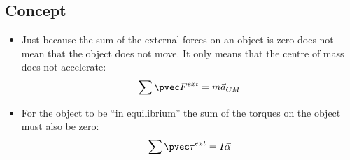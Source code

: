\documentclass[aspectratio=169,
hyperref={colorlinks,urlcolor=blue}
]{beamer}
\begin{document}
\subsection{Concept}
\label{subsec:concept}
{
\begin{itemize}
\item Just because the sum of the external forces on an object is zero does not mean that the object does not move. It only means that the centre of mass does not accelerate:
\begin{align*}
\sum \pvec F^{ext}=m\vec a_{CM}
\end{align*}
\item For the object to be ``in equilibrium'' the sum of the torques on the object must also be zero:
\begin{align*}
\sum \pvec \tau^{ext}=I\vec \alpha
\end{align*}
\end{itemize}

}
{
\begin{center}
\end{center}
}




\end{document}

